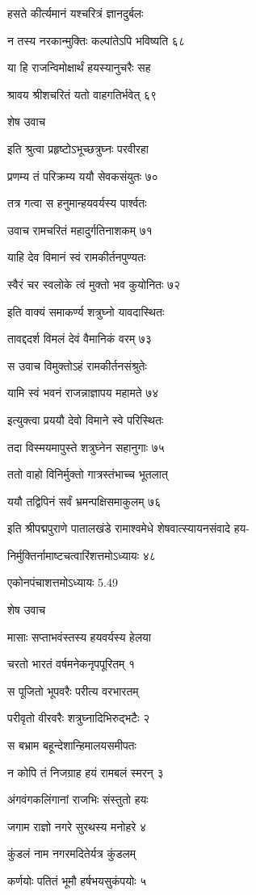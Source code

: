 हसते कीर्त्यमानं यश्चरित्रं ज्ञानदुर्बलः

न तस्य नरकान्मुक्तिः कल्पांतेऽपि भविष्यति ६८

या हि राजन्विमोक्षार्थं हयस्यानुचरैः सह

श्रावय श्रीशचरितं यतो वाहगतिर्भवेत् ६९

शेष उवाच

इति श्रुत्वा प्रहृष्टोऽभूच्छत्रुघ्नः परवीरहा

प्रणम्य तं परिक्रम्य ययौ सेवकसंयुतः ७०

तत्र गत्वा स हनुमान्हयवर्यस्य पार्श्वतः

उवाच रामचरितं महादुर्गतिनाशकम् ७१

याहि देव विमानं स्वं रामकीर्तनपुण्यतः

स्वैरं चर स्वलोके त्वं मुक्तो भव कुयोनितः ७२

इति वाक्यं समाकर्ण्य शत्रुघ्नो यावदास्थितः

तावद्ददर्श विमलं देवं वैमानिकं वरम् ७३

स उवाच विमुक्तोऽहं रामकीर्तनसंश्रुतेः

यामि स्वं भवनं राजन्नाज्ञापय महामते ७४

इत्युक्त्वा प्रययौ देवो विमाने स्वे परिस्थितः

तदा विस्मयमापुस्ते शत्रुघ्नेन सहानुगाः ७५

ततो वाहो विनिर्मुक्तो गात्रस्तंभाच्च भूतलात्

ययौ तद्विपिनं सर्वं भ्रमन्पक्षिसमाकुलम् ७६

इति श्रीपद्मपुराणे पातालखंडे रामाश्वमेधे शेषवात्स्यायनसंवादे हय-

निर्मुक्तिर्नामाष्टचत्वारिंशत्तमोऽध्यायः ४८

एकोनपंचाशत्तमोऽध्यायः 5.49

शेष उवाच

मासाः सप्ताभवंस्तस्य हयवर्यस्य हेलया

चरतो भारतं वर्षमनेकनृपपूरितम् १

स पूजितो भूपवरैः परीत्य वरभारतम्

परीवृतो वीरवरैः शत्रुघ्नादिभिरुद्भटैः २

स बभ्राम बहून्देशान्हिमालयसमीपतः

न कोपि तं निजग्राह हयं रामबलं स्मरन् ३

अंगवंगकलिंगानां राजभिः संस्तुतो हयः

जगाम राज्ञो नगरे सुरथस्य मनोहरे ४

कुंडलं नाम नगरमदितेर्यत्र कुंडलम्

कर्णयोः पतितं भूमौ हर्षभयसुकंपयोः ५

